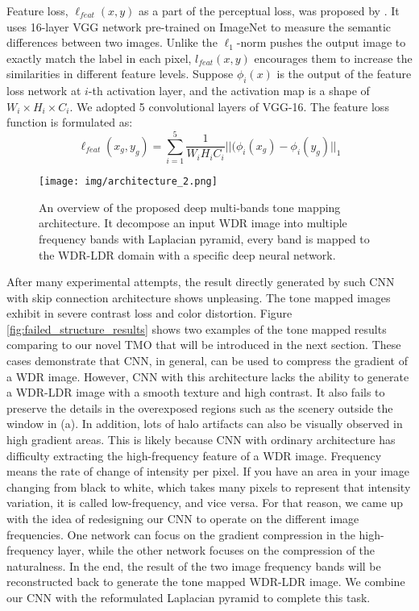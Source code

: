 \documentclass[journal]{IEEEtran}
\begin{document}
Feature loss, $\ell_{feat}(x,y)$ as a part of the perceptual loss, was proposed by \cite{johnson2016perceptual}.  It uses 16-layer VGG network pre-trained on ImageNet to measure the semantic differences between two images.  Unlike the $\ell_1$-norm pushes the output image to exactly match the label in each pixel,  $l_{feat}(x,y)$ encourages them to increase the similarities in different feature levels. Suppose $\phi_i(x)$ is the output of the feature loss network at $i$-th activation layer, and the activation map is a shape of $W_i \times H_i \times C_i$. We adopted 5 convolutional layers of VGG-16. The feature loss function is formulated as:
\begin{equation}
    \ell_{feat}(x_g,y_g) = \sum_{i=1}^{5}\frac{1}{W_iH_iC_i}||(\phi_i(x_g)-\phi_i(y_g)||_1
\end{equation}


\begin{figure*}[t]
\begin{center}
   \texttt{[image: img/architecture\_2.png]}
\end{center}	
   \caption{An overview of the proposed deep multi-bands tone mapping architecture. It decompose an input WDR image into multiple frequency bands with Laplacian pyramid, every band is mapped to the WDR-LDR domain with a specific deep neural network.}
\label{fig:architecture}
\end{figure*}

After many experimental attempts, the result directly generated by such CNN with skip connection architecture shows unpleasing.  The tone mapped images exhibit in severe contrast loss and color distortion.  Figure \ref{fig:failed_structure_results} shows two examples of the tone mapped results comparing to our novel TMO that will be introduced in the next section. These cases demonstrate that CNN, in general, can be used to compress the gradient of a WDR image.  However, CNN with this architecture lacks the ability to generate a WDR-LDR image with a smooth texture and high contrast.  It also fails to preserve the details in the overexposed regions such as the scenery outside the window in (a).  In addition, lots of halo artifacts can also be visually observed in high gradient areas.  This is likely because CNN with ordinary architecture has difficulty extracting the high-frequency feature of a WDR image. Frequency means the rate of change of intensity per pixel. If you have an area in your image changing from black to white, which takes many pixels to represent that intensity variation, it is called low-frequency, and vice versa. For that reason, we came up with the idea of redesigning our CNN to operate on the different image frequencies. One network can focus on the gradient compression in the high-frequency layer, while the other network focuses on the compression of the naturalness.  In the end, the result of the two image frequency bands will be reconstructed back to generate the tone mapped WDR-LDR image.  We combine our CNN with the reformulated Laplacian pyramid to complete this task.  
\end{document}
